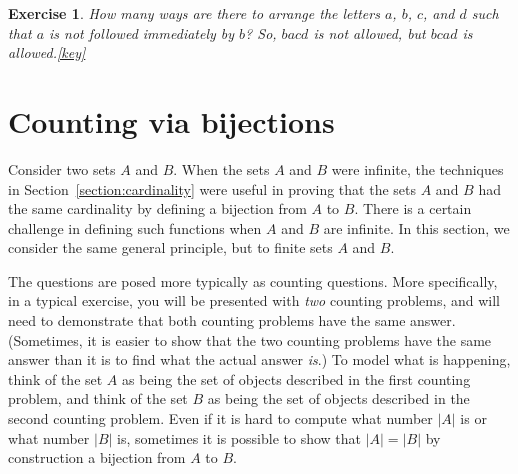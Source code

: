 \documentclass{book}
\newcounter{ekcounter}%
\theoremstyle{ekimcustom}
\newtheorem{exercise}[ekcounter]{Exercise}
\begin{document}
\begin{exercise}
How many ways are there to arrange the letters $a$, $b$, $c$, and $d$ such that $a$ is not followed immediately by $b$? So, $bacd$ is not allowed, but $bcad$ is allowed.\quad\quad\href{https://www.sharelatex.com/read/xnspxhrbntrw}{{\color{red}[key]}}
\end{exercise}

\section{Counting via bijections}\label{section:counting-via-bijections}

Consider two sets $A$ and $B$. When the sets $A$ and $B$ were infinite, the techniques in Section~\ref{section:cardinality} were useful in proving that the sets $A$ and $B$ had the same cardinality by defining a bijection from $A$ to $B$. There is a certain challenge in defining such functions when $A$ and $B$ are infinite. In this section, we consider the same general principle, but to finite sets $A$ and $B$. 

The questions are posed more typically as counting questions. More specifically, in a typical exercise, you will be presented with \emph{two} counting problems, and will need to demonstrate that both counting problems have the same answer. (Sometimes, it is easier to show that the two counting problems have the same answer than it is to find what the actual answer \emph{is}.) To model what is happening, think of the set $A$ as being the set of objects described in the first counting problem, and think of the set $B$ as being the set of objects described in the second counting problem. Even if it is hard to compute what number $|A|$ is or what number $|B|$ is, sometimes it is possible to show that $|A|=|B|$ by construction a bijection from $A$ to $B$.
\end{document}
